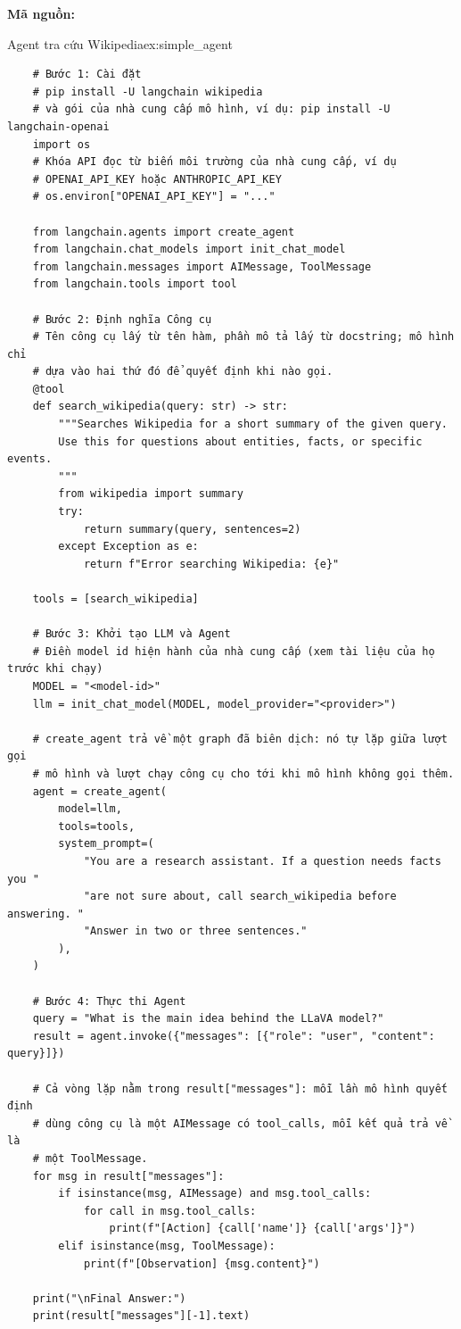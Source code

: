 \textbf{Mã nguồn:}
\begin{example}{Agent tra cứu Wikipedia}{ex:simple_agent}
    \begin{verbatim}
    # Bước 1: Cài đặt
    # pip install -U langchain wikipedia
    # và gói của nhà cung cấp mô hình, ví dụ: pip install -U langchain-openai
    import os
    # Khóa API đọc từ biến môi trường của nhà cung cấp, ví dụ
    # OPENAI_API_KEY hoặc ANTHROPIC_API_KEY
    # os.environ["OPENAI_API_KEY"] = "..."

    from langchain.agents import create_agent
    from langchain.chat_models import init_chat_model
    from langchain.messages import AIMessage, ToolMessage
    from langchain.tools import tool

    # Bước 2: Định nghĩa Công cụ
    # Tên công cụ lấy từ tên hàm, phần mô tả lấy từ docstring; mô hình chỉ
    # dựa vào hai thứ đó để quyết định khi nào gọi.
    @tool
    def search_wikipedia(query: str) -> str:
        """Searches Wikipedia for a short summary of the given query.
        Use this for questions about entities, facts, or specific events.
        """
        from wikipedia import summary
        try:
            return summary(query, sentences=2)
        except Exception as e:
            return f"Error searching Wikipedia: {e}"

    tools = [search_wikipedia]

    # Bước 3: Khởi tạo LLM và Agent
    # Điền model id hiện hành của nhà cung cấp (xem tài liệu của họ trước khi chạy)
    MODEL = "<model-id>"
    llm = init_chat_model(MODEL, model_provider="<provider>")

    # create_agent trả về một graph đã biên dịch: nó tự lặp giữa lượt gọi
    # mô hình và lượt chạy công cụ cho tới khi mô hình không gọi thêm.
    agent = create_agent(
        model=llm,
        tools=tools,
        system_prompt=(
            "You are a research assistant. If a question needs facts you "
            "are not sure about, call search_wikipedia before answering. "
            "Answer in two or three sentences."
        ),
    )

    # Bước 4: Thực thi Agent
    query = "What is the main idea behind the LLaVA model?"
    result = agent.invoke({"messages": [{"role": "user", "content": query}]})

    # Cả vòng lặp nằm trong result["messages"]: mỗi lần mô hình quyết định
    # dùng công cụ là một AIMessage có tool_calls, mỗi kết quả trả về là
    # một ToolMessage.
    for msg in result["messages"]:
        if isinstance(msg, AIMessage) and msg.tool_calls:
            for call in msg.tool_calls:
                print(f"[Action] {call['name']} {call['args']}")
        elif isinstance(msg, ToolMessage):
            print(f"[Observation] {msg.content}")

    print("\nFinal Answer:")
    print(result["messages"][-1].text)
    \end{verbatim}
\end{example}
